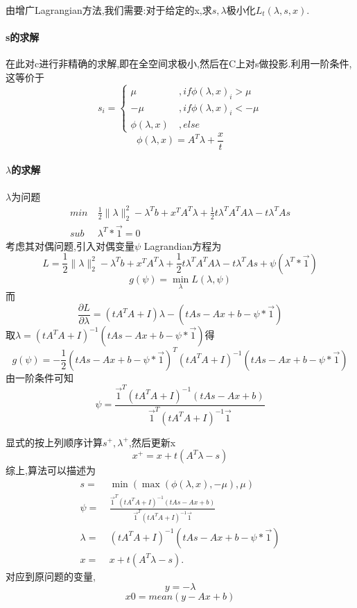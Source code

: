 \documentclass[UTF8]{ctexart}
\begin{document}
由增广Lagrangian方法,我们需要:对于给定的x,求$s,\lambda$极小化$L_{t}(\lambda ,s,x)$.
\paragraph{s的求解}
在此对c进行非精确的求解,即在全空间求极小,然后在C上对s做投影.利用一阶条件,这等价于
  $$
  s_{i}=\left\{
  \begin{aligned}
   \mu & \  ,if \phi(\lambda,x)_i>\mu \\
    -\mu &\ ,if \phi(\lambda,x)_i<-\mu \\
    \phi(\lambda,x) &\ ,  else
  \end{aligned}
  \right.
$$
$$
  \phi(\lambda,x) = A^T\lambda+\frac{x}{t}
  $$
\paragraph{$\lambda$的求解}
  $\lambda$为问题
    \begin{equation}\label{p:1}
    \begin{split}
       min\  & \frac{1}{2}\|\lambda \|_{2}^{2} - \lambda^T b + x^TA^T\lambda+\frac{1}{2}t\lambda^TA^TA\lambda-t\lambda^TAs\\
       sub\  & \lambda^T*\vec{1}=0
    \end{split}
  \end{equation}
  考虑其对偶问题,引入对偶变量$\psi$
  Lagrandian方程为
  $$
  L=\frac{1}{2}\|\lambda \|_{2}^{2} - \lambda^T b + x^TA^T\lambda+\frac{1}{2}t\lambda^TA^TA\lambda-t\lambda^TAs+\psi (\lambda^T*\vec{1})
  $$
  $$
  g(\psi)=\min\limits_{\lambda} L(\lambda,\psi)
  $$
  而
  $$
  \frac{\partial L}{\partial \lambda} = (tA^TA+I)\lambda - (tAs-Ax+b-\psi*\vec{1})
  $$
  取$\lambda=(tA^TA+I)^{-1}(tAs-Ax+b-\psi*\vec{1})$得
  $$
  g(\psi)=-\frac{1}{2}(tAs-Ax+b-\psi*\vec{1})^T(tA^TA+I)^{-1}(tAs-Ax+b-\psi*\vec{1})
  $$
  由一阶条件可知
  $$
  \psi=\frac{\vec{1}^T(tA^TA+I)^{-1}(tAs-Ax+b)}{\vec{1}^T(tA^TA+I)^{-1}\vec{1}}
  $$

  显式的按上列顺序计算$s^+,\lambda^+$,然后更新x
  $$
  x^+ = x+t(A^T\lambda-s)
  $$
  综上,算法可以描述为
  $$
  \begin{aligned}
   s =& \  \min(\max(\phi(\lambda,x),-\mu),\mu) \\
   \psi =& \ \frac{\vec{1}^T(tA^TA+I)^{-1}(tAs-Ax+b)}{\vec{1}^T(tA^TA+I)^{-1}\vec{1}}   \\
   \lambda = & \  (tA^TA+I)^{-1}(tAs-Ax+b-\psi*\vec{1}) \\
   x =&\  x+t(A^T\lambda-s).
  \end{aligned}
  $$
  对应到原问题的变量,
  $$
  y = -\lambda
  $$
$$
x0=mean(y-Ax+b)
$$

  
\end{document}
